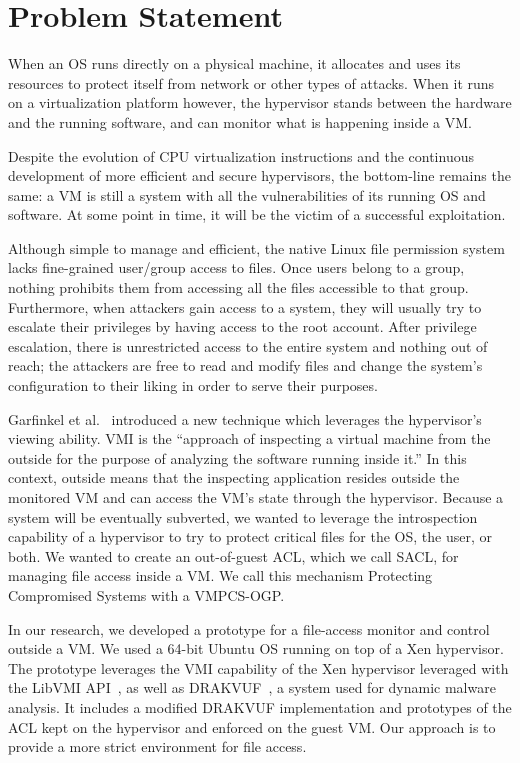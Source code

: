 \section{Problem Statement}\label{sec:problem} 
When an \ac{OS} runs directly on a physical machine, it allocates and uses its resources to protect itself from network or other types of attacks. When it runs on a virtualization platform however, the hypervisor stands between the hardware and the running software, and can monitor what is happening inside a \ac{VM}. 

\par Despite the evolution of \ac{CPU} virtualization instructions and the continuous development of more efficient and secure hypervisors, the bottom-line remains the same: a \ac{VM} is still a system with all the vulnerabilities of its running \ac{OS} and software. At some point in time, it will be the victim of a successful exploitation. 

\par Although simple to manage and efficient, the native Linux file permission system lacks fine-grained user/group access to files. Once users belong to a group, nothing prohibits them from accessing all the files accessible to that group. Furthermore, when attackers gain access to a system, they will usually try to escalate their privileges by having access to the root account. After privilege escalation, there is unrestricted access to the entire system and nothing out of reach; the attackers are free to read and modify files and change the system's configuration to their liking in order to serve their purposes.

\par Garfinkel et al.~\cite{garfinkel2003virtual} introduced a new technique which leverages the hypervisor's viewing ability. \ac{VMI} is the “approach of inspecting a virtual machine from the outside for the purpose of analyzing the software running inside it.” In this context, outside means that the inspecting application resides outside the monitored \ac{VM} and can access the \ac{VM}'s state through the hypervisor. Because a system will be eventually subverted, we wanted to leverage the introspection capability of a hypervisor to try to protect critical files for the OS, the user, or both. We wanted to create an out-of-guest \ac{ACL}, which we call \ac{SACL}, for managing file access inside a VM. We call this mechanism Protecting Compromised Systems with a \ac{VMPCS-OGP}.

\par In our research, we developed a prototype for a file-access monitor and control outside a \ac{VM}. We used a 64-bit Ubuntu OS running on top of a Xen hypervisor. The prototype leverages the \ac{VMI} capability of the Xen hypervisor leveraged with the LibVMI \ac{API}~\cite{payne2011libvmi}, as well as DRAKVUF~\cite{lengyel2014drakvuf}, a system used for dynamic malware analysis. It includes a modified DRAKVUF implementation and prototypes of the \ac{ACL} kept on the hypervisor and enforced on the guest \ac{VM}. Our approach is to provide a more strict environment for file access.

